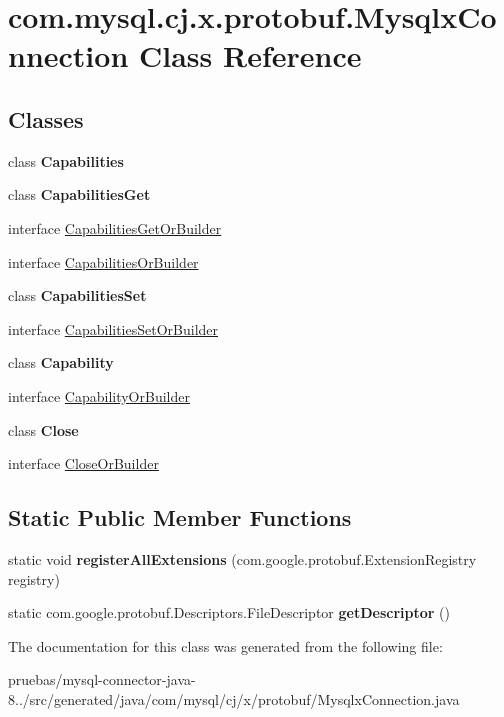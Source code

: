 \hypertarget{classcom_1_1mysql_1_1cj_1_1x_1_1protobuf_1_1_mysqlx_connection}{}\section{com.\+mysql.\+cj.\+x.\+protobuf.\+Mysqlx\+Connection Class Reference}
\label{classcom_1_1mysql_1_1cj_1_1x_1_1protobuf_1_1_mysqlx_connection}
\subsection*{Classes}
\begin{DoxyCompactItemize}
\item 
class {\bfseries Capabilities}
\item 
class {\bfseries Capabilities\+Get}
\item 
interface \mbox{\hyperlink{interfacecom_1_1mysql_1_1cj_1_1x_1_1protobuf_1_1_mysqlx_connection_1_1_capabilities_get_or_builder}{Capabilities\+Get\+Or\+Builder}}
\item 
interface \mbox{\hyperlink{interfacecom_1_1mysql_1_1cj_1_1x_1_1protobuf_1_1_mysqlx_connection_1_1_capabilities_or_builder}{Capabilities\+Or\+Builder}}
\item 
class {\bfseries Capabilities\+Set}
\item 
interface \mbox{\hyperlink{interfacecom_1_1mysql_1_1cj_1_1x_1_1protobuf_1_1_mysqlx_connection_1_1_capabilities_set_or_builder}{Capabilities\+Set\+Or\+Builder}}
\item 
class {\bfseries Capability}
\item 
interface \mbox{\hyperlink{interfacecom_1_1mysql_1_1cj_1_1x_1_1protobuf_1_1_mysqlx_connection_1_1_capability_or_builder}{Capability\+Or\+Builder}}
\item 
class {\bfseries Close}
\item 
interface \mbox{\hyperlink{interfacecom_1_1mysql_1_1cj_1_1x_1_1protobuf_1_1_mysqlx_connection_1_1_close_or_builder}{Close\+Or\+Builder}}
\end{DoxyCompactItemize}
\subsection*{Static Public Member Functions}
\begin{DoxyCompactItemize}
\item 
\mbox{\label{classcom_1_1mysql_1_1cj_1_1x_1_1protobuf_1_1_mysqlx_connection_a51f7a824fdb8a7d42f33dc31ef519a94}} 
static void {\bfseries register\+All\+Extensions} (com.\+google.\+protobuf.\+Extension\+Registry registry)
\item 
\mbox{\label{classcom_1_1mysql_1_1cj_1_1x_1_1protobuf_1_1_mysqlx_connection_af44fd15a800014c0f9290ee45f5fc6ce}} 
static com.\+google.\+protobuf.\+Descriptors.\+File\+Descriptor {\bfseries get\+Descriptor} ()
\end{DoxyCompactItemize}


The documentation for this class was generated from the following file\+:\begin{DoxyCompactItemize}
\item 
pruebas/mysql-\/connector-\/java-\/8../src/generated/java/com/mysql/cj/x/protobuf/Mysqlx\+Connection.\+java\end{DoxyCompactItemize}
